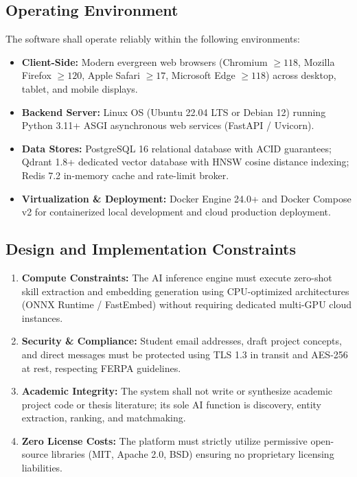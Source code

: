 \documentclass[11pt,a4paper]{article}
\begin{document}
\subsection{Operating Environment}
The software shall operate reliably within the following environments:
\begin{itemize}[noitemsep]
    \item \textbf{Client-Side:} Modern evergreen web browsers (Chromium $\ge 118$, Mozilla Firefox $\ge 120$, Apple Safari $\ge 17$, Microsoft Edge $\ge 118$) across desktop, tablet, and mobile displays.
    \item \textbf{Backend Server:} Linux OS (Ubuntu 22.04 LTS or Debian 12) running Python 3.11+ ASGI asynchronous web services (FastAPI / Uvicorn).
    \item \textbf{Data Stores:} PostgreSQL 16 relational database with ACID guarantees; Qdrant 1.8+ dedicated vector database with HNSW cosine distance indexing; Redis 7.2 in-memory cache and rate-limit broker.
    \item \textbf{Virtualization \& Deployment:} Docker Engine 24.0+ and Docker Compose v2 for containerized local development and cloud production deployment.
\end{itemize}

\subsection{Design and Implementation Constraints}
\begin{enumerate}[label=\textbf{(\arabic*)},noitemsep]
    \item \textbf{Compute Constraints:} The AI inference engine must execute zero-shot skill extraction and embedding generation using CPU-optimized architectures (ONNX Runtime / FastEmbed) without requiring dedicated multi-GPU cloud instances.
    \item \textbf{Security \& Compliance:} Student email addresses, draft project concepts, and direct messages must be protected using TLS 1.3 in transit and AES-256 at rest, respecting FERPA guidelines.
    \item \textbf{Academic Integrity:} The system shall not write or synthesize academic project code or thesis literature; its sole AI function is discovery, entity extraction, ranking, and matchmaking.
    \item \textbf{Zero License Costs:} The platform must strictly utilize permissive open-source libraries (MIT, Apache 2.0, BSD) ensuring no proprietary licensing liabilities.
\end{enumerate}
\end{document}
